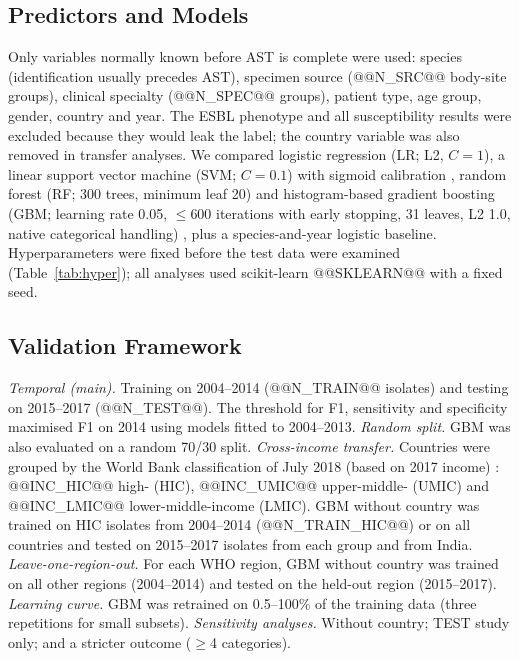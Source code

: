 \documentclass[conference]{IEEEtran}
\begin{document}
\subsection{Predictors and Models}\label{sec:predictors}
Only variables normally known before AST is complete were used: species (identification usually precedes AST), specimen source (@@N_SRC@@ body-site groups), clinical specialty (@@N_SPEC@@ groups), patient type, age group, gender, country and year. The ESBL phenotype and all susceptibility results were excluded because they would leak the label; the country variable was also removed in transfer analyses. We compared logistic regression (LR; L2, $C{=}1$), a linear support vector machine (SVM; $C{=}0.1$) with sigmoid calibration \cite{platt1999}, random forest (RF; 300 trees, minimum leaf 20) \cite{breiman2001} and histogram-based gradient boosting (GBM; learning rate 0.05, $\le$600 iterations with early stopping, 31 leaves, L2 1.0, native categorical handling) \cite{ke2017}, plus a species-and-year logistic baseline. Hyperparameters were fixed before the test data were examined (Table~\ref{tab:hyper}); all analyses used scikit-learn @@SKLEARN@@ \cite{pedregosa2011} with a fixed seed.

\subsection{Validation Framework}\label{sec:validation}
\textit{Temporal (main).} Training on 2004--2014 (@@N_TRAIN@@ isolates) and testing on 2015--2017 (@@N_TEST@@). The threshold for F1, sensitivity and specificity maximised F1 on 2014 using models fitted to 2004--2013. \textit{Random split.} GBM was also evaluated on a random 70/30 split. \textit{Cross-income transfer.} Countries were grouped by the World Bank classification of July 2018 (based on 2017 income) \cite{worldbank2018}: @@INC_HIC@@ high- (HIC), @@INC_UMIC@@ upper-middle- (UMIC) and @@INC_LMIC@@ lower-middle-income (LMIC). GBM without country was trained on HIC isolates from 2004--2014 (@@N_TRAIN_HIC@@) or on all countries and tested on 2015--2017 isolates from each group and from India. \textit{Leave-one-region-out.} For each WHO region, GBM without country was trained on all other regions (2004--2014) and tested on the held-out region (2015--2017). \textit{Learning curve.} GBM was retrained on 0.5--100\% of the training data (three repetitions for small subsets). \textit{Sensitivity analyses.} Without country; TEST study only; and a stricter outcome ($\ge$4 categories).
\end{document}
